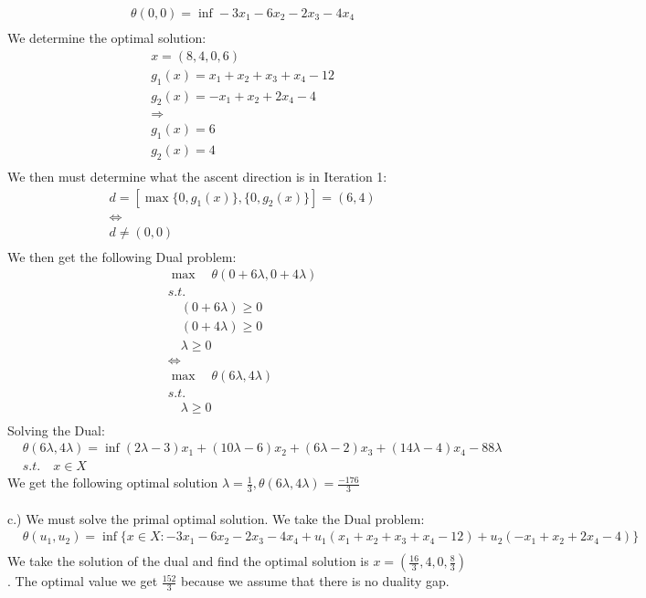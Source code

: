 \documentclass[12pt]{article}
\begin{document}
    \begin{align*}
        &\theta(0,0) = \inf -3x_1 - 6x_2 - 2x_3 - 4x_4\\
    \end{align*}
    We determine the optimal solution:\\
    \begin{align*}
        &x=(8,4,0,6)\\
        &g_1(x) = x_1 + x_2 + x_3 + x_4 -12\\
        &g_2(x) = -x_1 + x_2 + 2x_4 - 4 \\
        &\Longrightarrow\\
        &g_1(x) = 6\\
        &g_2(x) = 4\\
    \end{align*}
    We then must determine what the ascent direction is in Iteration 1: \\ 
    \begin{align*}
        &d = [\max \{0, g_1(x)\} , \{0,g_2(x)\}] = (6,4)\\
        &\Longleftrightarrow \\
        &d \neq (0,0)\\
    \end{align*}
    We then get the following Dual problem: 
    \begin{align*}
        &\max \quad \theta(0 + 6\lambda , 0 + 4\lambda) \\ 
        &s.t.\\
        &\quad (0 + 6\lambda) \geq 0\\
        &\quad (0 + 4 \lambda) \geq 0 \\ 
        &\quad \lambda \geq 0\\
        &\Longleftrightarrow\\
        &\max \quad \theta (6\lambda, 4\lambda)\\
        &s.t.\\
        &\quad \lambda \geq 0 \\ 
    \end{align*}
    Solving the Dual: \\
    \begin{align*}
        &\theta(6\lambda,4\lambda) = \inf  (2\lambda -3) x_1 + (10\lambda - 6) x_2 + (6\lambda -2) x_3 + (14\lambda -4) x_4 - 88\lambda\\
        &s.t. \quad  x \in X
    \end{align*}
    We get the following optimal solution $\lambda = \frac{1}{3}, \theta(6\lambda, 4\lambda) = \frac{-176}{3}$\\\\
    c.) We must solve the primal optimal solution.
    We take the Dual problem:\\
        \begin{align*}
            &\theta(u_1,u_2) = \inf \{x \in X:  -3x_1 - 6x_2 - 2x_3 - 4x_4 + u_1(x_1 + x_2 + x_3 +x_4 -12) + u_2(-x_1 + x_2 + 2x_4 - 4) \}\\
        \end{align*}
    We take the solution of the dual and find the optimal solution is $x = (\frac{16}{3}, 4, 0, \frac{8}{3})$. The optimal value we get $\frac{152}{3}$ because we assume that there is no duality gap. 
\end{document}
